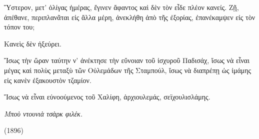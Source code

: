 \documentclass[11pt]{article}
\begin{document}
Ὕστερον, μετ' ὀλίγας ἡμέρας, ἔγινεν ἄφαντος καὶ δὲν τὸν εἶδε πλέον κανείς. Ζῇ, ἀπέθανε, περιπλανᾶται εἰς ἄλλα μέρη, ἀνεκλήθη ἀπὸ τῆς ἐξορίας, ἐπανέκαμψεν εἰς τὸν τόπον του;

Κανεὶς δὲν ἠξεύρει.

Ἴσως τὴν ὥραν ταύτην ν' ἀνέκτησε τὴν εὔνοιαν τοῦ ἰσχυροῦ Παδισάχ, ἴσως νὰ εἶναι μέγας καὶ πολὺς μεταξὺ τῶν Οὐλεμάδων τῆς Σταμπούλ, ἴσως νὰ διαπρέπῃ ὡς ἰμάμης εἰς κανὲν ἐξακουστὸν τζαμίον.

Ἴσως νὰ εἶναι εὐνοούμενος τοῦ Χαλίφη, ἀρχιουλεμάς, σεϊχουλισλάμης.

\emph{Μποὺ ντουνιὰ τσὰρκ φιλέκ.}

(1896)
\end{document}
